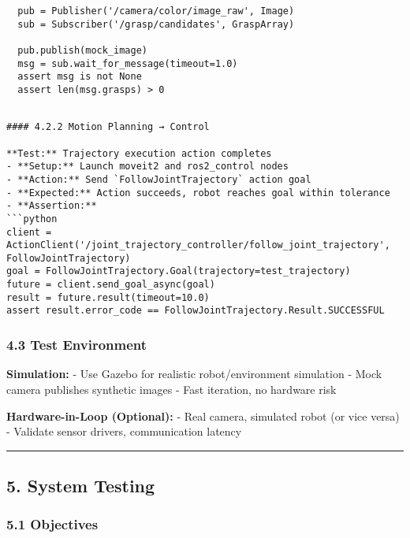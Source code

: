 \documentclass[
]{article}
\begin{document}
\begin{verbatim}
  pub = Publisher('/camera/color/image_raw', Image)
  sub = Subscriber('/grasp/candidates', GraspArray)

  pub.publish(mock_image)
  msg = sub.wait_for_message(timeout=1.0)
  assert msg is not None
  assert len(msg.grasps) > 0
\end{verbatim}

\begin{verbatim}

#### 4.2.2 Motion Planning → Control

**Test:** Trajectory execution action completes
- **Setup:** Launch moveit2 and ros2_control nodes
- **Action:** Send `FollowJointTrajectory` action goal
- **Expected:** Action succeeds, robot reaches goal within tolerance
- **Assertion:**
```python
client = ActionClient('/joint_trajectory_controller/follow_joint_trajectory', FollowJointTrajectory)
goal = FollowJointTrajectory.Goal(trajectory=test_trajectory)
future = client.send_goal_async(goal)
result = future.result(timeout=10.0)
assert result.error_code == FollowJointTrajectory.Result.SUCCESSFUL
\end{verbatim}

\hypertarget{test-environment}{%
\subsubsection{4.3 Test Environment}\label{test-environment}}

\textbf{Simulation:} - Use Gazebo for realistic robot/environment
simulation - Mock camera publishes synthetic images - Fast iteration, no
hardware risk

\textbf{Hardware-in-Loop (Optional):} - Real camera, simulated robot (or
vice versa) - Validate sensor drivers, communication latency

\begin{center}\rule{0.5\linewidth}{0.5pt}\end{center}

\hypertarget{system-testing}{%
\subsection{5. System Testing}\label{system-testing}}

\hypertarget{objectives-2}{%
\subsubsection{5.1 Objectives}\label{objectives-2}}
\end{document}
